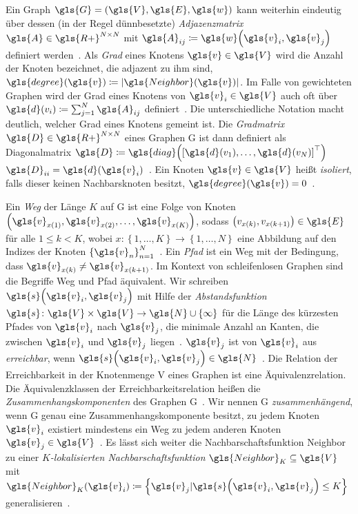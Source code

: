 Ein Graph $\gls{G} = \left(\gls{V}, \gls{E}, \gls{w}\right)$ kann weiterhin eindeutig über dessen (in der Regel dünnbesetzte) \emph{Adjazenzmatrix} $\gls{A} \in \gls{R+}^{N \times N}$ mit $\gls{A}_{ij} \coloneqq \gls{w}\left(\gls{v}_i, \gls{v}_j\right)$ definiert werden~\cite{Defferrard}.
Als \emph{Grad} eines Knotens $\gls{v} \in \gls{V}$ wird die Anzahl der Knoten bezeichnet, die adjazent zu ihm sind, \dhe{} $\gls{degree}\left(\gls{v}\right) \coloneqq \left|\gls{Neighbor}\left(\gls{v}\right)\right|$.
Im Falle von gewichteten Graphen wird der Grad eines Knotens von $\gls{v}_i \in \gls{V}$ auch oft über $\gls{d}\left(v_i\right) \coloneqq \sum^N_{j=1} \gls{A}_{ij}$ definiert~\cite{Defferrard}.
Die unterschiedliche Notation macht deutlich, welcher Grad eines Knotens gemeint ist.
Die \emph{Gradmatrix} $\gls{D} \in \gls{R+}^{N \times N}$ eines Graphen \gls{G} ist dann definiert als Diagonalmatrix $\gls{D} \coloneqq \gls{diag}\left( {\left[ \gls{d}\left(v_1\right), \ldots, \gls{d}\left(v_N\right) \right]}^{\top} \right)$ \bzw{} $\gls{D}_{ii} = \gls{d}\left(\gls{v}_i\right)$~\cite{Defferrard}.
Ein Knoten $\gls{v} \in \gls{V}$ heißt \emph{isoliert}, falls dieser keinen Nachbarsknoten besitzt, \dhe{} $\gls{degree}\left(\gls{v}\right) = 0$~\cite{Defferrard}.

Ein \emph{Weg} der Länge $K$ auf \gls{G} ist eine Folge von Knoten $\left(\gls{v}_{x\left(1\right)}, \gls{v}_{x\left(2\right)}, \ldots, \gls{v}_{x\left(K\right)}\right)$, sodass $\left(v_{x\left(k\right)}, v_{x\left(k+1\right)}\right) \in \gls{E}$ für alle $1 \leq k < K$, wobei $x \colon \left\{ 1, \ldots, K \right\} \to \left\{ 1, \ldots, N \right\}$ eine Abbildung auf den Indizes der Knoten ${\left\{ \gls{v}_n \right\}}^N_{n=1}$~\cite{Biggs}.
Ein \emph{Pfad} ist ein Weg mit der Bedingung, dass $\gls{v}_{x\left(k\right)} \neq \gls{v}_{x\left(k+1\right)}$.
Im Kontext von schleifenlosen Graphen sind die Begriffe Weg und Pfad äquivalent.
Wir schreiben $\gls{s}\left(\gls{v}_i, \gls{v}_j\right)$ mit Hilfe der \emph{Abstandsfunktion} $\gls{s} \colon \gls{V} \times \gls{V} \to \gls{N} \cup \left\{\infty\right\}$ für die Länge des kürzesten Pfades von $\gls{v}_i$ nach $\gls{v}_j$, \dhe{} die minimale Anzahl an Kanten, die zwischen $\gls{v}_i$ und $\gls{v}_j$ liegen~\cite{Hammond}.
$\gls{v}_j$ ist von $\gls{v}_i$ aus \emph{erreichbar}, wenn $\gls{s}\left(\gls{v}_i, \gls{v}_j\right) \in \gls{N}$~\cite{Biggs}.
Die Relation der Erreichbarkeit in der Knotenmenge \gls{V} eines Graphen ist eine Äquivalenzrelation.
Die Äquivalenzklassen der Erreichbarkeitsrelation heißen die \emph{Zusammenhangskomponenten} des Graphen \gls{G}~\cite{Biggs}.
Wir nennen \gls{G} \emph{zusammenhängend}, wenn \gls{G} genau eine Zusammenhangskomponente besitzt, \dhe{} zu jedem Knoten $\gls{v}_i$ existiert mindestens ein Weg zu jedem anderen Knoten $\gls{v}_j \in \gls{V}$~\cite{Hammond}.
Es lässt sich weiter die Nachbarschaftsfunktion \gls{Neighbor} zu einer \emph{$K$-lokalisierten Nachbarschaftsfunktion} $\gls{Neighbor}_K \subseteq \gls{V}$ mit $\gls{Neighbor}_K\left(\gls{v}_i\right) \coloneqq \left\{ \gls{v}_j | \gls{s}\left(\gls{v}_i, \gls{v}_j\right) \leq K \right\}$ generalisieren~\cite{Hammond}.

